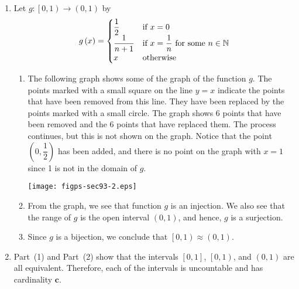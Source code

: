 \begin{enumerate}
\begin{enumerate}
\begin{enumerate}
\item Since $f$ is a bijection, we conclude that $\left[0, 1 \right] \approx \left[ 0, 1 \right)$.
\end{enumerate}

\item Let $g: \left[ 0, 1 \right) \to \left( 0, 1 \right)$ by
\begin{equation} \notag
g \left( x \right) = 
\begin{cases}
\dfrac{1}{2}           &\text{if $x=0$} \\
\dfrac{1}{n+1}         &\text{if $x=\dfrac{1}{n}$ for some $n \in \mathbb{N}$} \\
x        &\text{otherwise}
\end{cases}
\end{equation}
%
\begin{enumerate}
\item The following graph shows some of the graph of the function $g$.  The points marked with a small square on the line $y = x$ indicate the points that have been removed from this line.  They have been replaced by the points marked with a small circle.  The graph shows 6 points that have been removed and the 6 points that have replaced them.  The process continues, but this is not shown on the graph.  Notice that the point $\left( 0, \dfrac{1}{2} \right)$ has been added, and there is no point on the graph with $x = 1$ since 1 is not in the domain of $g$.

\begin{center}
\texttt{[image: figps-sec93-2.eps]}
\end{center}
%
\item From the graph, we see that function $g$ is an injection.  We also see that the range of 
$g$ is the open interval $\left( 0, 1 \right)$, and hence, $g$ is a surjection.  

\item Since $g$ is a bijection, we conclude that $\left[0, 1 \right) \approx \left( 0, 1 \right)$.
\end{enumerate}

\item Part~(1) and Part~(2) show that the intervals $\left[0, 1 \right]$, $\left[0, 1 \right)$, and $\left(0, 1 \right)$ are all equivalent.  Therefore, each of the intervals is uncountable and has cardinality $\boldsymbol{c}$.


\end{enumerate}


\end{enumerate}

\hbreak
\endinput

